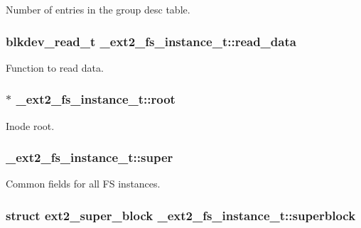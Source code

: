 Number of entries in the group desc table. \hypertarget{struct__ext2__fs__instance__t_ac3ea85962b66914cb42ec884d70a853d}{
\subsubsection[{read\+\_\+data}]{\setlength{\rightskip}{0pt plus 5cm}blkdev\+\_\+read\+\_\+t \+\_\+ext2\+\_\+fs\+\_\+instance\+\_\+t\+::read\+\_\+data}}\label{struct__ext2__fs__instance__t_ac3ea85962b66914cb42ec884d70a853d}
Function to read data. \hypertarget{struct__ext2__fs__instance__t_a52f883f2d709ab3b4dff94b5b7100973}{
\subsubsection[{root}]{$\ast$ \+\_\+ext2\+\_\+fs\+\_\+instance\+\_\+t\+::root}}\label{struct__ext2__fs__instance__t_a52f883f2d709ab3b4dff94b5b7100973}
Inode root. \hypertarget{struct__ext2__fs__instance__t_a456ee695fb1a0b71edadda9f4504ca2d}{
\subsubsection[{super}]{ \+\_\+ext2\+\_\+fs\+\_\+instance\+\_\+t\+::super}}\label{struct__ext2__fs__instance__t_a456ee695fb1a0b71edadda9f4504ca2d}
Common fields for all F\+S instances. \hypertarget{struct__ext2__fs__instance__t_a81ad8719743e20da6f661c2586b56ad2}{
\subsubsection[{superblock}]{\setlength{\rightskip}{0pt plus 5cm}struct {\bf ext2\+\_\+super\+\_\+block} \+\_\+ext2\+\_\+fs\+\_\+instance\+\_\+t\+::superblock}}\label{struct__ext2__fs__instance__t_a81ad8719743e20da6f661c2586b56ad2}
